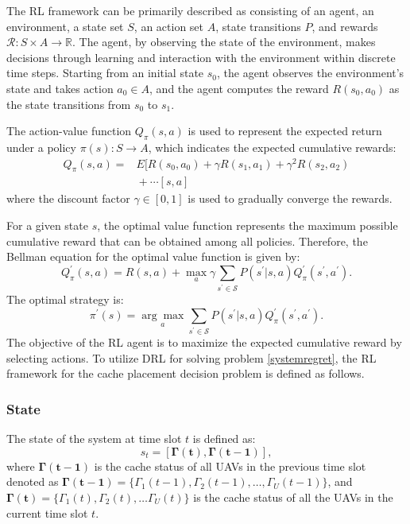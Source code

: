 \documentclass[journal]{IEEEtran}
\begin{document}
The RL framework can be primarily described as consisting of an agent, an environment, a state set \( S \), an action set \( A \), state transitions \( P \), and rewards \( \mathcal{R}: S \times A \to \mathbb{R} \). The agent, by observing the state of the environment, makes decisions through learning and interaction with the environment within discrete time steps. Starting from an initial state \( s_0 \), the agent observes the environment’s state and takes action \( a_0 \in A \), and the agent computes the reward \( R(s_0, a_0) \) as the state transitions from \( s_0 \) to \( s_1 \). 

The action-value function \( Q_{\pi}(s,a) \) is used to represent the expected return under a policy \( \pi(s): S \to A \), which indicates the expected cumulative rewards:
\begin{align}
Q_{\pi }(s,a)=&E[R(s_{0},a_{0})+\gamma R(s_{1},a_{1})+\gamma ^{2}R(s_{2},a_{2}) \nonumber \\
&{} +\cdots [s,a] 
\label{eq:Q_function}
\end{align}
where the discount factor \( \gamma \in [0,1] \) is used to gradually converge the rewards.

For a given state \( s \), the optimal value function represents the maximum possible cumulative reward that can be obtained among all policies. Therefore, the Bellman equation for the optimal value function is given by:
\begin{equation}
Q_{\pi }^{\prime }(s,a)=R(s,a)+\underset {a}{\max }{\gamma \sum _{s^{\prime }\in \mathcal {S}}{P(s^{\prime }|s,a)}}Q_{\pi }^{\prime }(s^{\prime },a^{\prime }).
\label{eq:bellman_eq}
\end{equation}
The optimal strategy is:
\begin{equation}
\pi ^{\prime }(s)=\underset {a}{\arg \max }{\sum _{s^{\prime }\in \mathcal {S}}{P(s^{\prime }|s,a)}}Q_{\pi }^{\prime }(s^{\prime },a^{\prime }).
\label{eq:optimal_policy}
\end{equation}
The objective of the RL agent is to maximize the expected cumulative reward by selecting actions. To utilize DRL for solving problem \textcolor{blue}{\ref{systemregret}}, the RL framework for the cache placement decision problem is defined as follows.

\subsubsection{State} 
The state of the system at time slot \( t \) is defined as: \begin{equation}
s_{t} = \left[ { \boldsymbol{\Gamma(t) , \Gamma(t-1)}}\right], 
\end{equation} where \(  \boldsymbol{\Gamma(t-1)}\) is the cache status of all UAVs in the previous time slot denoted as \( \boldsymbol{\Gamma(t-1)} = \{\Gamma_1(t-1),\Gamma_2(t-1),\dots, \Gamma_U(t-1)\}\), and  \( \boldsymbol{\Gamma(t)} = \{ \Gamma_1(t) ,\Gamma_2(t), \dots \Gamma_U(t)\}\) is the cache status of all the UAVs in the current time slot $t$. 
\end{document}
